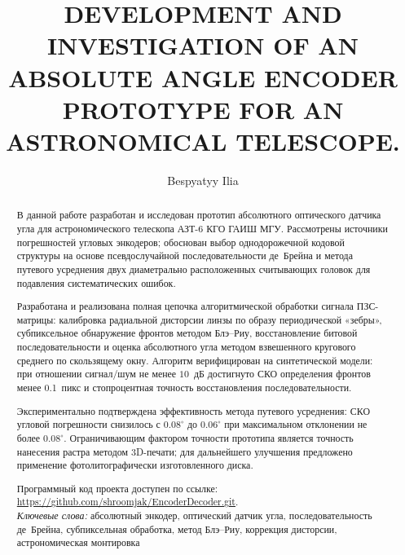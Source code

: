 \begin{abstract}
В данной работе разработан и исследован прототип абсолютного оптического датчика угла для астрономического телескопа АЗТ-6 КГО ГАИШ МГУ. Рассмотрены источники погрешностей угловых энкодеров; обоснован выбор однодорожечной кодовой структуры на основе псевдослучайной последовательности де~Брейна и метода путевого усреднения двух диаметрально расположенных считывающих головок для подавления систематических ошибок.

Разработана и реализована полная цепочка алгоритмической обработки сигнала ПЗС-матрицы: калибровка радиальной дисторсии линзы по образу периодической «зебры», субпиксельное обнаружение фронтов методом Блэ--Риу, восстановление битовой последовательности и оценка абсолютного угла методом взвешенного кругового среднего по скользящему окну. Алгоритм верифицирован на синтетической модели: при отношении сигнал/шум не менее $10$~дБ достигнуто СКО определения фронтов менее 0.1~пикс и стопроцентная точность восстановления последовательности.

Экспериментально подтверждена эффективность метода путевого усреднения: СКО угловой погрешности снизилось с $0.08^\circ$ до $0.06^\circ$ при максимальном отклонении не более $0.08^\circ$. Ограничивающим фактором точности прототипа является точность нанесения растра методом 3D-печати; для дальнейшего улучшения предложено применение фотолитографически изготовленного диска.

Программный код проекта доступен по ссылке: \url{https://github.com/shroomjak/EncoderDecoder.git}.\\
\emph{Ключевые слова:} {абсолютный энкодер, оптический датчик угла, последовательность де~Брейна, субпиксельная обработка, метод Блэ--Риу, коррекция дисторсии, астрономическая монтировка}
\end{abstract}



\bigskip


\title{\uppercase{DEVELOPMENT AND INVESTIGATION OF AN ABSOLUTE ANGLE ENCODER PROTOTYPE FOR AN ASTRONOMICAL TELESCOPE. }} %

\author{Bespyatyy Ilia} %

\address{Moscow Lomonosov State University}

